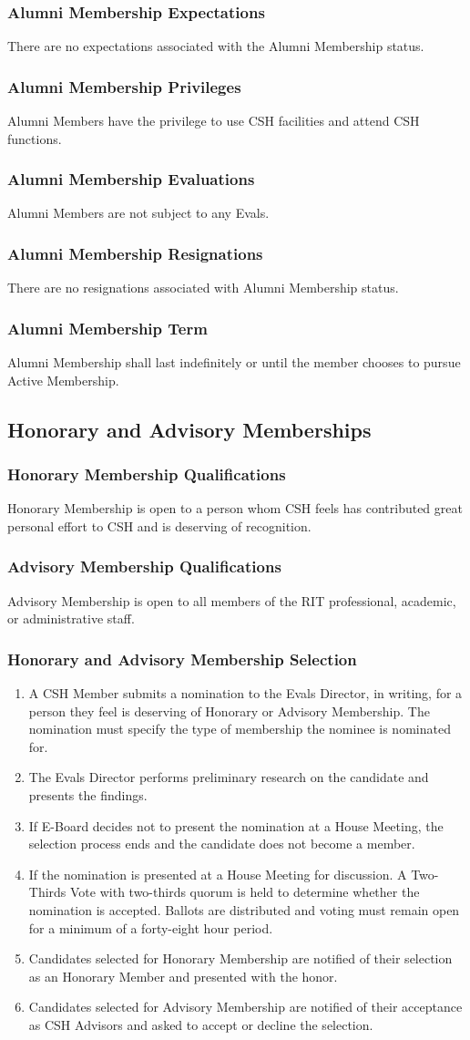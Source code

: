 \documentclass{article}
\newcommand{\asection}[1]{\subsection{#1} \label{#1}}
\newcommand{\asubsection}[1]{\subsubsection{#1} \label{#1}}
\begin{document}
\asubsection{Alumni Membership Expectations}
There are no expectations associated with the Alumni Membership status.

\asubsection{Alumni Membership Privileges}
Alumni Members have the privilege to use CSH facilities and attend CSH functions.

\asubsection{Alumni Membership Evaluations}
Alumni Members are not subject to any Evals.

\asubsection{Alumni Membership Resignations}
There are no resignations associated with Alumni Membership status.

\asubsection{Alumni Membership Term}
Alumni Membership shall last indefinitely or until the member chooses to pursue Active Membership.

\asection{Honorary and Advisory Memberships}

\asubsection{Honorary Membership Qualifications}
Honorary Membership is open to a person whom CSH feels has contributed great personal effort to CSH and is deserving of recognition.

\asubsection{Advisory Membership Qualifications}
Advisory Membership is open to all members of the RIT professional, academic, or administrative staff.

\asubsection{Honorary and Advisory Membership Selection}
\begin{enumerate}
	\item A CSH Member submits a nomination to the Evals Director, in writing, for a person they feel is deserving of Honorary or Advisory Membership. The nomination must specify the type of membership the nominee is nominated for.
	\item The Evals Director performs preliminary research on the candidate and presents the findings.
	\item If E-Board decides not to present the nomination at a House Meeting, the selection process ends and the candidate does not become a member.
	\item If the nomination is presented at a House Meeting for discussion. A Two-Thirds Vote with two-thirds quorum is held to determine whether the nomination is accepted.
	      Ballots are distributed and voting must remain open for a minimum of a forty-eight hour period.
	\item Candidates selected for Honorary Membership are notified of their selection as an Honorary Member and presented with the honor.
	\item Candidates selected for Advisory Membership are notified of their acceptance as CSH Advisors and asked to accept or decline the selection.
\end{enumerate}
\end{document}
